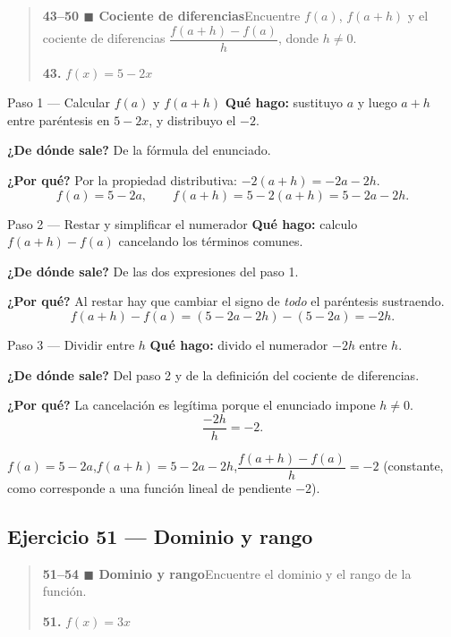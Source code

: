 \documentclass[11pt]{article}
\begin{document}
\begin{quote}
\textbf{43--50 $\blacksquare$ Cociente de diferencias}\quad Encuentre $f(a)$, $f(a+h)$ y el cociente de diferencias $\dfrac{f(a+h)-f(a)}{h}$, donde $h\ne0$.

\textbf{43.} $f(x)=5-2x$
\end{quote}

\begin{paso}{Paso 1 --- Calcular $f(a)$ y $f(a+h)$}
\textbf{Qué hago:} sustituyo $a$ y luego $a+h$ entre paréntesis en $5-2x$, y distribuyo el $-2$.

\textbf{¿De dónde sale?} De la fórmula del enunciado.

\textbf{¿Por qué?} Por la propiedad distributiva: $-2(a+h)=-2a-2h$.
\[
f(a)=5-2a,\qquad f(a+h)=5-2(a+h)=5-2a-2h.
\]
\end{paso}

\begin{paso}{Paso 2 --- Restar y simplificar el numerador}
\textbf{Qué hago:} calculo $f(a+h)-f(a)$ cancelando los términos comunes.

\textbf{¿De dónde sale?} De las dos expresiones del paso 1.

\textbf{¿Por qué?} Al restar hay que cambiar el signo de \emph{todo} el paréntesis sustraendo.
\[
f(a+h)-f(a)=(5-2a-2h)-(5-2a)=-2h.
\]
\end{paso}

\begin{paso}{Paso 3 --- Dividir entre $h$}
\textbf{Qué hago:} divido el numerador $-2h$ entre $h$.

\textbf{¿De dónde sale?} Del paso 2 y de la definición del cociente de diferencias.

\textbf{¿Por qué?} La cancelación es legítima porque el enunciado impone $h\ne0$.
\[
\frac{-2h}{h}=-2.
\]
\end{paso}

\begin{resp}
$f(a)=5-2a$,\quad $f(a+h)=5-2a-2h$,\quad $\dfrac{f(a+h)-f(a)}{h}=-2$ (constante, como corresponde a una función lineal de pendiente $-2$).
\end{resp}

\subsection*{Ejercicio 51 — Dominio y rango}

\begin{quote}
\textbf{51--54 $\blacksquare$ Dominio y rango}\quad Encuentre el dominio y el rango de la función.

\textbf{51.} $f(x)=3x$
\end{quote}
\end{document}
